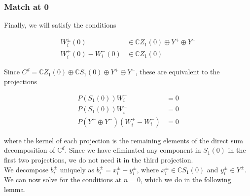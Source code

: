\documentclass[12pt]{article}
\def\C{{\mathbb C}}
\begin{document}
\subsubsection{Match at 0}

Finally, we will satisfy the conditions

\begin{align*}
W_i^\pm(0) &\in \C Z_1(0) \oplus Y^+ \oplus Y^- \\
W_i^+(0) - W_i^-(0) &\in \C Z_1(0)
\end{align*}

Since $C^d = \C Z_1(0) \oplus \C S_1(0) \oplus Y^+ \oplus Y^-$, these are equivalent to the projections

\begin{align*}
P(S_1(0)) W_i^- &= 0 \\
P(S_1(0)) W_i^+ &= 0 \\
P(Y^+ \oplus Y^-) (W_i^+ - W_i^-) &= 0
\end{align*}

where the kernel of each projection is the remaining elements of the direct sum decomposition of $\C^d$. Since we have eliminated any component in $S_1(0)$ in the first two projections, we do not need it in the third projection.\\

We decompose $b_i^\pm$ uniquely as $b_i^\pm = x_i^\pm + y_i^\pm$, where $x_i^\pm \in \C S_1(0)$ and $y_i^\pm \in Y^\pm$.\\

We can now solve for the conditions at $n = 0$, which we do in the following lemma.
\end{document}
